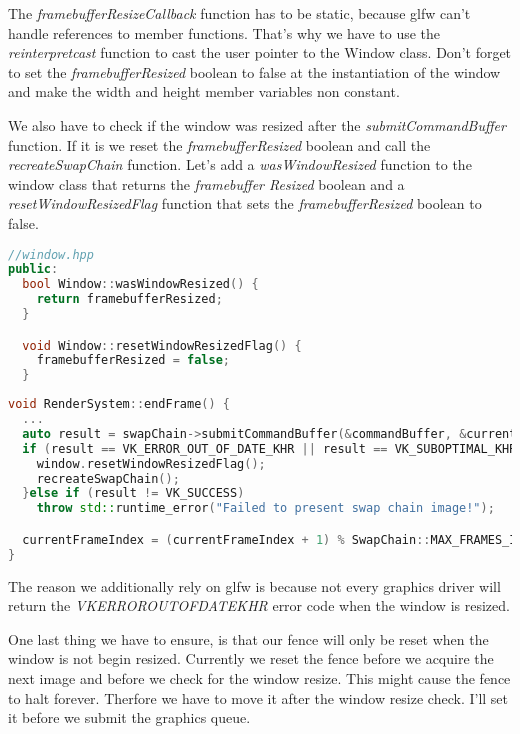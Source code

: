 \documentclass[12pt]{report} \usepackage{preamble}
\begin{document}
The \textit{framebufferResizeCallback} function has to be static, because glfw can't handle references to member functions. That's why we have to use the
\textit{reinterpret\textunderscore cast} function to cast the user pointer to the Window class. Don't forget to set the \textit{framebufferResized} boolean to
false at the instantiation of the window and make the width and height member variables non constant.

We also have to check if the window was resized after the \textit{submitCommandBuffer} function. If it is we reset the \textit{framebufferResized} boolean
and call the \textit{recreateSwapChain} function. Let's add a \textit{wasWindowResized} function to the window class that returns the \textit{framebuffer
	Resized} boolean and a \textit{resetWindowResizedFlag} function that sets the \textit{framebufferResized} boolean to false.

\begin{lstlisting}[language=C++]
//window.hpp
public:
  bool Window::wasWindowResized() {
    return framebufferResized;
  }

  void Window::resetWindowResizedFlag() {
    framebufferResized = false;
  }
\end{lstlisting}

\begin{lstlisting}[language=C++]
void RenderSystem::endFrame() {
  ...
  auto result = swapChain->submitCommandBuffer(&commandBuffer, &currentImageIndex);
  if (result == VK_ERROR_OUT_OF_DATE_KHR || result == VK_SUBOPTIMAL_KHR || window.wasWindowResized()) {
    window.resetWindowResizedFlag();
    recreateSwapChain();
  }else if (result != VK_SUCCESS)
    throw std::runtime_error("Failed to present swap chain image!");

  currentFrameIndex = (currentFrameIndex + 1) % SwapChain::MAX_FRAMES_IN_FLIGHT;
}
\end{lstlisting}

The reason we additionally rely on glfw is because not every graphics driver will return the \textit{VK\textunderscore ERROR\textunderscore OUT\textunderscore OF\textunderscore DATE\textunderscore KHR}
error code when the window is resized.

One last thing we have to ensure, is that our fence will only be reset when the window is not begin resized. Currently we reset the fence before we acquire the next image and before we check for the window resize.
This might cause the fence to halt forever. Therfore we have to move it after the window resize check. I'll set it before we submit the graphics queue.
\end{document}
